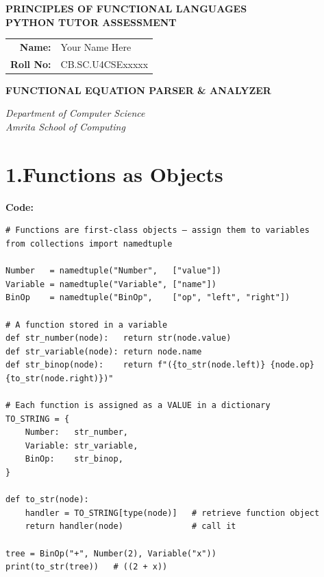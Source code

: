 \documentclass[12pt, a4paper]{article}
\begin{document}
\begin{titlepage}
\centering
\vspace*{2.5cm}

{\Large\bfseries PRINCIPLES OF FUNCTIONAL LANGUAGES\\[0.5em]
PYTHON TUTOR ASSESSMENT\par}

\vspace{3cm}

{\normalsize
\begin{tabular}{rl}
\textbf{Name:}    & Your Name Here \\[0.3em]
\textbf{Roll No:} & CB.SC.U4CSExxxxx \\
\end{tabular}
\par}

\vspace{3.5cm}

{\Large\bfseries FUNCTIONAL EQUATION PARSER \& ANALYZER\par}

\vfill
{\small\itshape Department of Computer Science\\
Amrita School of Computing}

\end{titlepage}

\tableofcontents
\newpage

\section{1.\quad Functions as Objects}

\textbf{Code:}

\begin{lstlisting}
# Functions are first-class objects — assign them to variables
from collections import namedtuple

Number   = namedtuple("Number",   ["value"])
Variable = namedtuple("Variable", ["name"])
BinOp    = namedtuple("BinOp",    ["op", "left", "right"])

# A function stored in a variable
def str_number(node):   return str(node.value)
def str_variable(node): return node.name
def str_binop(node):    return f"({to_str(node.left)} {node.op} {to_str(node.right)})"

# Each function is assigned as a VALUE in a dictionary
TO_STRING = {
    Number:   str_number,
    Variable: str_variable,
    BinOp:    str_binop,
}

def to_str(node):
    handler = TO_STRING[type(node)]   # retrieve function object
    return handler(node)              # call it

tree = BinOp("+", Number(2), Variable("x"))
print(to_str(tree))   # ((2 + x))
\end{lstlisting}
\end{document}
